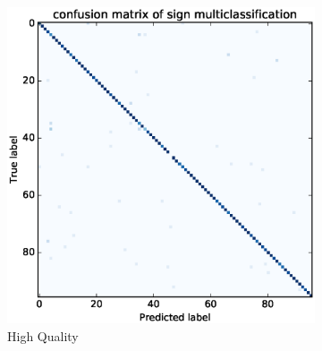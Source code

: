 \documentclass[twocolumn]{article}
\begin{document}
\begin{figure}[t]
\centering
\begin{subfigure}[b]{0.48\linewidth}
        \includegraphics[trim=100 22 80 39, clip,width=1.0\linewidth]{results/svm_high_quality_confusion}
        \caption{High Quality}
\end{subfigure}%
~
\begin{subfigure}[b]{0.48\linewidth}

\end{subfigure}
\end{figure}
\end{document}
